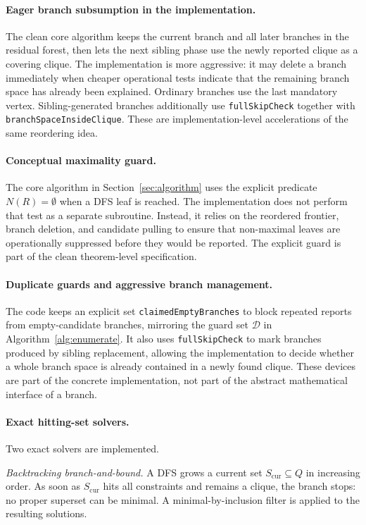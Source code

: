 \documentclass[sigconf, nonacm]{acmart}
\theoremstyle{definition}
\theoremstyle{remark}
\begin{document}
\paragraph{Eager branch subsumption in the implementation.}
The clean core algorithm keeps the current branch and all later branches in the
residual forest, then lets the next sibling phase use the newly reported clique
as a covering clique.  The implementation is more aggressive: it may delete a
branch immediately when cheaper operational tests indicate that the remaining
branch space has already been explained.  Ordinary branches use the last
mandatory vertex.  Sibling-generated branches additionally use
\texttt{fullSkipCheck} together with
\texttt{branchSpaceInsideClique}.  These are implementation-level accelerations
of the same reordering idea.

\paragraph{Conceptual maximality guard.}
The core algorithm in Section~\ref{sec:algorithm} uses the explicit predicate
$N(R)=\emptyset$ when a DFS leaf is reached.  The implementation does not
perform that test as a separate subroutine.  Instead, it relies on the
reordered frontier, branch deletion, and candidate pulling to ensure that
non-maximal leaves are operationally suppressed before they would be reported.
The explicit guard is part of the clean theorem-level specification.

\paragraph{Duplicate guards and aggressive branch management.}
The code keeps an explicit set \texttt{claimedEmptyBranches} to block repeated
reports from empty-candidate branches, mirroring the guard set $\mathcal{D}$ in
Algorithm~\ref{alg:enumerate}.  It also uses \texttt{fullSkipCheck} to mark
branches produced by sibling replacement, allowing the implementation to decide
whether a whole branch space is already contained in a newly found clique.
These devices are part of the concrete implementation, not part of the abstract
mathematical interface of a branch.

\paragraph{Exact hitting-set solvers.}
Two exact solvers are implemented.

\textit{Backtracking branch-and-bound.}  A DFS grows a current set
$S_{\mathrm{cur}} \subseteq Q$ in increasing order.  As soon as
$S_{\mathrm{cur}}$ hits all constraints and remains a clique, the branch stops:
no proper superset can be minimal.  A minimal-by-inclusion filter is applied to
the resulting solutions.
\end{document}
